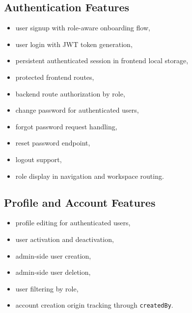 \documentclass[12pt,a4paper]{article}
\begin{document}
\subsection{Authentication Features}
\begin{itemize}[leftmargin=*]
  \item user signup with role-aware onboarding flow,
  \item user login with JWT token generation,
  \item persistent authenticated session in frontend local storage,
  \item protected frontend routes,
  \item backend route authorization by role,
  \item change password for authenticated users,
  \item forgot password request handling,
  \item reset password endpoint,
  \item logout support,
  \item role display in navigation and workspace routing.
\end{itemize}

\subsection{Profile and Account Features}
\begin{itemize}[leftmargin=*]
  \item profile editing for authenticated users,
  \item user activation and deactivation,
  \item admin-side user creation,
  \item admin-side user deletion,
  \item user filtering by role,
  \item account creation origin tracking through \texttt{createdBy}.
\end{itemize}
\end{document}
